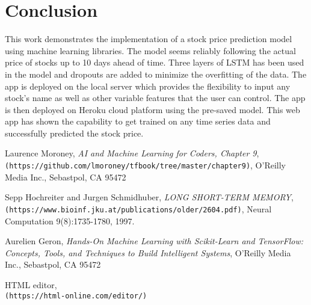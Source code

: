\documentclass[11pt]{diazessay} %
\begin{document}
\section{Conclusion}

This work demonstrates the implementation of a stock price prediction model using machine learning libraries. The model seems reliably following the actual price of stocks up to 10 days ahead of time. Three layers of LSTM has been used in the model and dropouts are added to minimize the overfitting of the data. The app is deployed on the local server which provides the flexibility to input any stock's name as well as other variable features that the user can control. The app is then deployed on Heroku cloud platform using the pre-saved model. This web app has shown the capability to get trained on any time series data and successfully predicted the stock price.    


\begin{thebibliography}{9}

Laurence Moroney,
\textit{AI and Machine Learning for Coders, Chapter 9},
\\\texttt{(https://github.com/lmoroney/tfbook/tree/master/chapter9)},
O'Reilly Media Inc., Sebastpol, CA 95472

Sepp Hochreiter and Jurgen Schmidhuber,
\textit{LONG SHORT-TERM MEMORY},
\\\texttt{(https://www.bioinf.jku.at/publications/older/2604.pdf)},
Neural Computation 9(8):1735-1780, 1997.

Aurelien Geron,
\textit{Hands-On Machine Learning with Scikit-Learn and TensorFlow: Concepts, Tools, and Techniques to Build Intelligent Systems},
O'Reilly Media Inc., Sebastpol, CA 95472

HTML editor,
\\\texttt{(https://html-online.com/editor/)}

\end{thebibliography}

\end{document}
